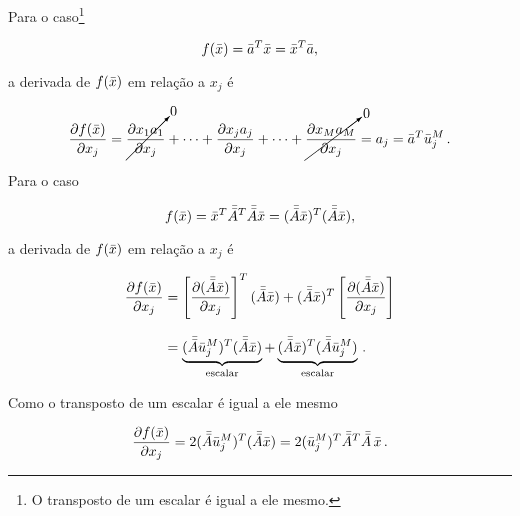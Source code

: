 \begin{example}
    Para o caso\footnote{O transposto de um escalar é igual a ele mesmo.}

    \begin{equation}
    f(\bar{x}) = \bar{a}^T\bar{x} = \bar{x}^T\bar{a},
    \end{equation}
    
    \noindent a derivada de $f(\bar{x})$ em relação
    a $x_j$ é
    
    \begin{equation}
    \dfrac{\partial f(\bar{x})}{\partial x_j} =
        \cancelto{0}{\dfrac{\partial x_1a_1}{\partial x_j}} + \dotsb +
        \dfrac{\partial x_ja_j}{\partial x_j} + \dotsb +
        \cancelto{0}{\dfrac{\partial x_M a_M}{\partial x_j}}
        = a_j = \bar{a}^T \bar{u}_j^M
    \thinspace .
    \label{eq:deriv_aTx}
    \end{equation}
\end{example}

\begin{example}
    Para o caso

    \begin{equation}
    f(\bar{x}) = \bar{x}^T\bar{\bar{A}}^T\bar{\bar{A}}\bar{x} =
        (\bar{\bar{A}}\bar{x})^T(\bar{\bar{A}}\bar{x}),
    \end{equation}
    
    \noindent a derivada de $f(\bar{x})$ em relação
    a $x_j$ é
    
    \begin{equation}
    \begin{split}
    \dfrac{\partial f(\bar{x})}{\partial x_j} &=
        \left[\dfrac{\partial(\bar{\bar{A}}\bar{x})}{\partial x_j}\right]^T(\bar{\bar{A}}\bar{x}) +
        (\bar{\bar{A}}\bar{x})^T\left[\dfrac{\partial(\bar{\bar{A}}\bar{x})}{\partial x_j}\right]
    \\[0.3cm]
    &=
    \underbrace{(\bar{\bar{A}}\bar{u}_j^M)^T(\bar{\bar{A}}\bar{x})}_{\text{escalar}} + 
    \underbrace{(\bar{\bar{A}}\bar{x})^T(\bar{\bar{A}}\bar{u}_j^M)}_{\text{escalar}}
    \thinspace .
    \end{split}
    \end{equation}

    \noindent Como o transposto de um escalar é igual a ele mesmo

    \begin{equation}
    \dfrac{\partial f(\bar{x})}{\partial x_j} =
        2(\bar{\bar{A}}\bar{u}_j^M)^T(\bar{\bar{A}}\bar{x}) =
        2(\bar{u}_j^M)^T \bar{\bar{A}}^T\bar{\bar{A}}\thinspace\bar{x}
    \thinspace .
    \label{eq:deriv_xTATAx}
    \end{equation}    
\end{example}


